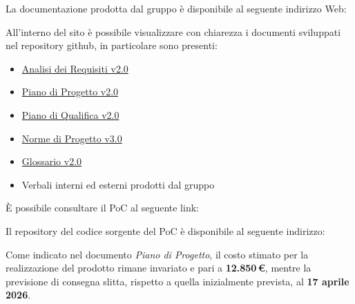 \documentclass[a4paper, 11pt, oneside]{scrartcl} %
\begin{document}
La documentazione prodotta dal gruppo è disponibile al seguente indirizzo Web:

\begin{center}

\end{center}

All'interno del sito è possibile visualizzare con chiarezza i documenti sviluppati nel repository github, in particolare sono presenti:
\begin{itemize}
    \item \href{https://swenightpro.github.io/Documentazione/docs/RTB/Documentazione\%20Esterna/Analisi_dei_Requisiti_v2.0.pdf}{Analisi dei Requisiti v2.0}
    \item \href{https://swenightpro.github.io/Documentazione/docs/RTB/Documentazione\%20Esterna/Piano_di_Progetto_v2.0.pdf}{Piano di Progetto v2.0}
    \item \href{https://swenightpro.github.io/Documentazione/docs/RTB/Documentazione\%20Esterna/Piano_di_Qualifica_v2.0.pdf}{Piano di Qualifica v2.0}
    \item \href{https://swenightpro.github.io/Documentazione/docs/RTB/Documentazione\%20Interna/Norme_di_Progetto_v3.0.pdf}{Norme di Progetto v3.0}
    \item \href{https://swenightpro.github.io/Documentazione/docs/RTB/Documentazione\%20Esterna/Glossario_v2.0.pdf}{Glossario v2.0}
    \item Verbali interni ed esterni prodotti dal gruppo
\end{itemize}

È possibile consultare il PoC al seguente link:

    \begin{center}

\end{center}

Il repository del codice sorgente del PoC è disponibile al seguente indirizzo:

    \begin{center}

\end{center}
Come indicato nel documento \textit{Piano di Progetto}, il costo stimato per la realizzazione del prodotto rimane invariato e pari a \textbf{12.850\,€}, mentre la previsione di consegna slitta, rispetto a quella inizialmente prevista, al \textbf{17 aprile 2026}.
\end{document}
